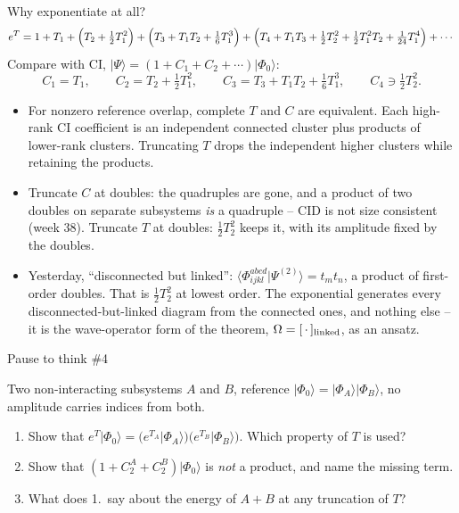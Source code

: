 \documentclass[aspectratio=169,10pt]{beamer}
\newcounter{thinkctr}
\newcommand{\thinkq}[2]{%
  \stepcounter{thinkctr}%
  \vfill
  \begin{tcolorbox}[enhanced,colback=palewarm,colframe=warm,boxrule=1.2pt,arc=4pt,
    grow to left by=6mm,grow to right by=6mm,
    left=16pt,right=16pt,top=16pt,bottom=18pt,
    fonttitle=\bfseries\Large,fontupper=\Large,
    title={Pause to think \#\thethinkctr\hfill\mdseries\normalsize(about #1 min -- discuss with your neighbour)}]
  #2
  \end{tcolorbox}
  \vfill}
\newcommand{\ket}[1]{\vert #1\rangle}
\newcommand{\ph}{\Phi_0}
\begin{document}
\begin{frame}{Why exponentiate at all?}
\small
\[
e^{T}=1+T_1+\Bigl(T_2+\tfrac12T_1^2\Bigr)+\Bigl(T_3+T_1T_2+\tfrac16T_1^3\Bigr)+\Bigl(T_4+T_1T_3+\tfrac12T_2^2+\tfrac12T_1^2T_2+\tfrac1{24}T_1^4\Bigr)+\cdots
\]
Compare with CI, $\ket{\Psi}=(1+C_1+C_2+\cdots)\ket{\ph}$:
\[
C_1=T_1,\qquad C_2=T_2+\tfrac12T_1^2,\qquad C_3=T_3+T_1T_2+\tfrac16T_1^3,\qquad C_4\ni\tfrac12T_2^2 .
\]
\begin{itemize}
\item For nonzero reference overlap, complete $T$ and $C$ are equivalent. Each high-rank CI coefficient is an independent connected cluster plus products of lower-rank clusters. Truncating $T$ drops the independent higher clusters while retaining the products.
\item Truncate $C$ at doubles: the quadruples are gone, and a product of two doubles on separate subsystems \emph{is} a quadruple -- CID is not size consistent (week 38). Truncate $T$ at doubles: $\tfrac12T_2^2$ keeps it, with its amplitude fixed by the doubles.
\item Yesterday, ``disconnected but linked'': $\langle\Phi_{ijkl}^{abcd}|\Psi^{(2)}\rangle=t_mt_n$, a product of first-order doubles. That is $\tfrac12T_2^2$ at lowest order. The exponential generates every disconnected-but-linked diagram from the connected ones, and nothing else -- it is the wave-operator form of the theorem, $\Omega=[\,\cdot\,]_{\rm linked}$, as an ansatz.
\end{itemize}
\end{frame}

\begin{frame}{Pause to think \#4}
\thinkq{3}{Two non-interacting subsystems $A$ and $B$, reference $\ket{\ph}=\ket{\Phi_A}\ket{\Phi_B}$, no amplitude carries indices from both.
\begin{enumerate}
\item Show that $e^{T}\ket{\ph}=\bigl(e^{T_A}\ket{\Phi_A}\bigr)\bigl(e^{T_B}\ket{\Phi_B}\bigr)$. Which property of $T$ is used?
\item Show that $(1+C_2^A+C_2^B)\ket{\ph}$ is \emph{not} a product, and name the missing term.
\item What does 1.\ say about the energy of $A+B$ at any truncation of $T$?
\end{enumerate}}
\end{frame}
\end{document}
